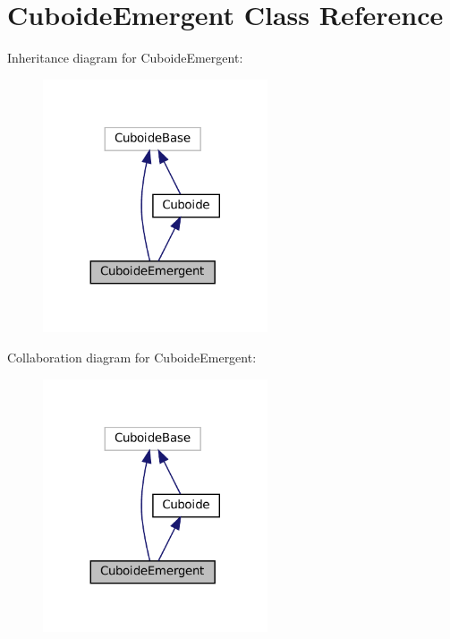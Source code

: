 \hypertarget{class_cuboide_emergent}{}\section{Cuboide\+Emergent Class Reference}
\label{class_cuboide_emergent}


Inheritance diagram for Cuboide\+Emergent\+:\nopagebreak
\begin{figure}[H]
\begin{center}
\leavevmode
\includegraphics[width=188pt]{class_cuboide_emergent__inherit__graph}
\end{center}
\end{figure}


Collaboration diagram for Cuboide\+Emergent\+:\nopagebreak
\begin{figure}[H]
\begin{center}
\leavevmode
\includegraphics[width=188pt]{class_cuboide_emergent__coll__graph}
\end{center}
\end{figure}
